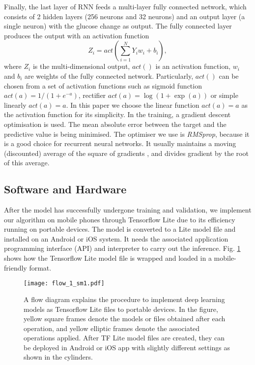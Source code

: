\documentclass[a4paper, 10 pt, twocolumn]{IEEEtran}
\begin{document}
Finally, the last layer of RNN feeds a multi-layer fully connected network, which consists of 2 hidden layers (256 neurons and 32 neurons) and an output layer (a single neuron) with the glucose change as output. The fully
connected layer produces the output with an activation function
\begin{equation}\label{eq:fully}
 Z_i = act(\sum_{i=1}^{N} Y_i w_i + b_i),
\end{equation}
where $Z_i$ is the multi-dimensional output, $act()$ is an activation function, $w_i$ and $b_i$ are weights of the fully connected network. Particularly, $act()$ can be chosen from a set of activation functions such as
sigmoid function $act(a)= 1/(1+e^{-a})$, rectifier $act(a) = \log{(1+\exp(a))}$ or simple linearly $act(a) = a$. In this paper we choose {the linear function  $act(a) = a$ as the activation function for its simplicity}.
 In the training, a gradient descent optimisation is used.
 The mean absolute error between the target and the predictive value is being minimised. The optimiser we use is \emph{RMSprop}, because it is a good choice for recurrent neural networks.  { It usually maintains a moving
 (discounted) average of the square of gradients \cite{Ruder-AnOverviewOf2016}, and divides gradient by the root of this average.}

\subsection{Software and Hardware}
After the model has successfully undergone training and validation, we implement our algorithm on mobile phones through Tensorflow Lite due to its efficiency running on portable devices. The model is converted to a Lite
model file and installed on an Android or iOS system. It needs the associated application programming interface (API) and interpreter to carry out the inference. Fig. \ref{fig:flow1} shows how the Tensorflow Lite model
file \cite{tensorflow2015-whitepaper} is wrapped and loaded in a mobile-friendly format.

  \begin{figure}[t]
  \texttt{[image: flow\_1\_sm1.pdf]} %
  \centering
  \caption{ A flow diagram explains the procedure to implement deep learning models as Tensorflow Lite files to portable devices. In the figure, yellow square frames denote the models or files obtained after each
  operation, and yellow elliptic frames denote the associated operations applied. After TF Lite model files are created, they can be deployed in Android or iOS app with slightly different settings as shown in the
  cylinders. }\label{fig:flow1}
  \centering
 \end{figure}
\end{document}
